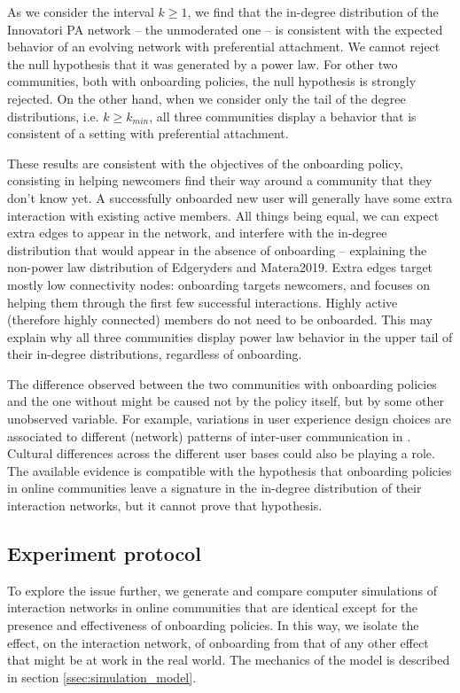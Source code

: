 \documentclass{bmcart}
\begin{document}
As we consider the interval  $k \geq 1$, we find that the in-degree distribution of the Innovatori PA network -- the unmoderated one -- is consistent with the expected behavior of an evolving network with preferential attachment. We cannot reject the null hypothesis that it was generated by a power law. For other two communities, both with onboarding policies, the null hypothesis is strongly rejected. On the other hand, when we consider only the tail of the degree distributions, i.e. $k \geq k_{min}$, all three communities display a behavior that is consistent of a setting with preferential attachment.

These results are consistent with the objectives of the onboarding policy, consisting in helping newcomers find their way around a community that they don't know yet. A successfully onboarded new user will generally have some extra interaction with existing active members. All things being equal, we can expect extra edges to appear in the network, and interfere with the in-degree distribution that would appear in the absence of onboarding -- explaining the non-power law distribution of Edgeryders and Matera2019. Extra edges target mostly low connectivity nodes: onboarding targets newcomers, and focuses on helping them through the first few successful interactions. Highly active (therefore highly connected) members do not need to be onboarded. This may explain why all three communities display power law behavior in the upper tail of their in-degree distributions, regardless of onboarding. 

The difference observed between the two communities with onboarding policies and the one without might be caused not by the policy itself, but by some other unobserved variable. For example, variations in user experience design choices are associated to different (network) patterns of inter-user communication in \cite{hodas2014simple}. Cultural differences across the different user bases could also be playing a role. The available evidence is compatible with the hypothesis that onboarding policies in online communities leave a signature in the in-degree distribution of their interaction networks, but it cannot prove that hypothesis.

\subsection{Experiment protocol}
\label{ss:experiment_protocol}
To explore the issue further, we generate and compare computer simulations of interaction networks in online communities that are identical except for the presence and effectiveness of onboarding policies. In this way, we isolate the effect, on the interaction network, of onboarding from that of any other effect that might be at work in the real world. The mechanics of the model is described in section \ref{ssec:simulation_model}.
\end{document}
